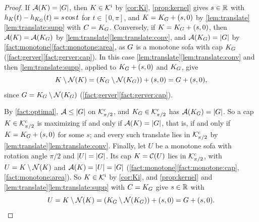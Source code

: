 \begin{proof}
If $\mathcal{A}(K)=\lvert G\rvert$, then $K\in\mathcal{K}^{\mathrm{i}}$ by \cref{cor:Ki}, \cref{prop:kernel} gives
$s\in\mathbb{R}$ with $h_K(t)-h_{K_G}(t)=s\cos t$ for $t\in[0,\pi]$, and $K=K_G+(s,0)$
by \cref{lem:translate}\ref{lem:translate:supp} with $C=K_G$. Conversely, if
$K=K_G+(s,0)$, then $\mathcal{A}(K)=\mathcal{A}(K_G)$ by
\cref{lem:translate}\ref{lem:translate:conv}, and $\mathcal{A}(K_G)=\lvert G\rvert$ by
\cref{fact:monotone}\ref{fact:monotone:area}, as $G$ is a monotone sofa with
cap $K_G$ (\cref{fact:gerver}\ref{fact:gerver:cap}). In this case
\cref{lem:translate}\ref{lem:translate:conv} and then \ref{lem:translate:supp},
applied to $K_G+(s,0)$ and $K_G$, give
\[
  K\setminus\mathcal{N}(K)=(K_G\setminus\mathcal{N}(K_G))+(s,0)=G+(s,0),
\]
since $G=K_G\setminus\mathcal{N}(K_G)$ (\cref{fact:gerver}\ref{fact:gerver:cap}).

By \cref{fact:optimal}, $\mathcal{A}\le\lvert G\rvert$ on $\mathcal{K}^{\mathrm{c}}_{\pi/2}$, and
$K_G\in\mathcal{K}^{\mathrm{c}}_{\pi/2}$ has $\mathcal{A}(K_G)=\lvert G\rvert$. So a cap $K\in\mathcal{K}^{\mathrm{c}}_{\pi/2}$ is
maximizing if and only if $\mathcal{A}(K)=\lvert G\rvert$, that is, if and only if
$K=K_G+(s,0)$ for some $s$; and every such translate lies in $\mathcal{K}^{\mathrm{c}}_{\pi/2}$ by
\cref{lem:translate}\ref{lem:translate:conv}. Finally, let $U$ be a monotone
sofa with rotation angle $\pi/2$ and $\lvert U\rvert=\lvert G\rvert$. Its cap $K=\mathcal{C}(U)$ lies
in $\mathcal{K}^{\mathrm{c}}_{\pi/2}$, with $U=K\setminus\mathcal{N}(K)$ and $\mathcal{A}(K)=\lvert U\rvert=\lvert G\rvert$
(\cref{fact:monotone}\ref{fact:monotone:cap}, \ref{fact:monotone:area}). So
$K\in\mathcal{K}^{\mathrm{i}}$ by \cref{cor:Ki}, and \cref{prop:kernel} and
\cref{lem:translate}\ref{lem:translate:supp} with $C=K_G$ give $s\in\mathbb{R}$ with
\[
  U=K\setminus\mathcal{N}(K)=(K_G\setminus\mathcal{N}(K_G))+(s,0)=G+(s,0).\qedhere
\]
\end{proof}


